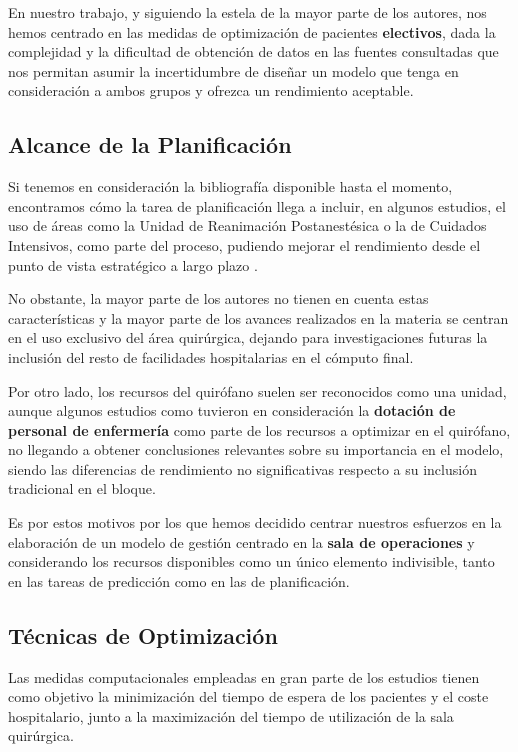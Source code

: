 En nuestro trabajo, y siguiendo la estela de la mayor parte de los autores, nos hemos centrado en las medidas de optimización de pacientes \textbf{electivos}, dada la complejidad y la dificultad de obtención de datos en las fuentes consultadas que nos permitan asumir la incertidumbre de diseñar un modelo que tenga en consideración a ambos grupos y ofrezca un rendimiento aceptable.


\subsection{Alcance de la Planificación}

Si tenemos en consideración la bibliografía disponible hasta el momento, encontramos cómo la tarea de planificación llega a incluir, en algunos estudios, el uso de áreas como la Unidad de Reanimación Postanestésica o la de Cuidados Intensivos, como parte del proceso, pudiendo mejorar el rendimiento desde el punto de vista estratégico a largo plazo \cite{Gur2018ApplicationOverview}.

No obstante, la mayor parte de los autores no tienen en cuenta estas características y la mayor parte de los avances realizados en la materia se centran en el uso exclusivo del área quirúrgica, dejando para investigaciones futuras la inclusión del resto de facilidades hospitalarias en el cómputo final.

Por otro lado, los recursos del quirófano suelen ser reconocidos como una unidad, aunque algunos estudios como \cite{DiMartinelly2014AnScheduling} tuvieron en consideración la \textbf{dotación de personal de enfermería }como parte de los recursos a optimizar en el quirófano, no llegando a obtener conclusiones relevantes sobre su importancia en el modelo, siendo las diferencias de rendimiento no significativas respecto a su inclusión tradicional en el bloque.

Es por estos motivos por los que hemos decidido centrar nuestros esfuerzos en la elaboración de un modelo de gestión centrado en la \textbf{sala de operaciones} y considerando los recursos disponibles como un único elemento indivisible, tanto en las tareas de predicción como en las de planificación.

\subsection{Técnicas de Optimización}

Las medidas computacionales empleadas en gran parte de los estudios tienen como objetivo la minimización del tiempo de espera de los pacientes y el coste hospitalario, junto a la maximización del tiempo de utilización de la sala quirúrgica.

